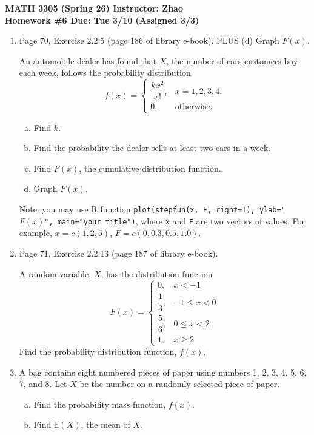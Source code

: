 \documentclass[12pt]{article}
\begin{document}
\begin{center}
  \textbf{\large MATH 3305 (Spring 26) \hfill Instructor: Zhao}\\[4pt]
  \textbf{\large Homework \#6 \hfill Due: Tue 3/10 (Assigned 3/3)}
\end{center}

\bigskip

\begin{enumerate}
  \item Page 70, Exercise 2.2.5 (page 186 of library e-book). PLUS (d) Graph $F(x)$.

    An automobile dealer has found that $X$, the number of cars customers buy each week, follows the probability distribution
    \[
      f(x) = \begin{cases} \dfrac{kx^2}{x!}, & x = 1, 2, 3, 4. \\[6pt] 0, & \text{otherwise.} \end{cases}
    \]
    \begin{enumerate}[(a)]
      \item Find $k$.
      \item Find the probability the dealer sells at least two cars in a week.
      \item Find $F(x)$, the cumulative distribution function.
      \item Graph $F(x)$.
    \end{enumerate}

    Note: you may use R function \texttt{plot(stepfun(x, F, right=T), ylab="$F(x)$", main="your title")}, where \texttt{x} and \texttt{F} are two vectors of values. For example, $x = c(1,2,5)$, $F = c(0, 0.3, 0.5, 1.0)$.

  \item Page 71, Exercise 2.2.13 (page 187 of library e-book).

    A random variable, $X$, has the distribution function
    \[
      F(x) = \begin{cases} 0, & x < -1 \\[4pt] \dfrac{1}{3}, & -1 \le x < 0 \\[6pt] \dfrac{5}{6}, & 0 \le x < 2 \\[6pt] 1, & x \ge 2 \end{cases}
    \]
    Find the probability distribution function, $f(x)$.

  \item A bag contains eight numbered pieces of paper using numbers 1, 2, 3, 4, 5, 6, 7, and 8. Let $X$ be the number on a randomly selected piece of paper.
    \begin{enumerate}[(a)]
      \item Find the probability mass function, $f(x)$.
      \item Find $\mathbb{E}(X)$, the mean of $X$.
    \end{enumerate}


\end{enumerate}
\end{document}
